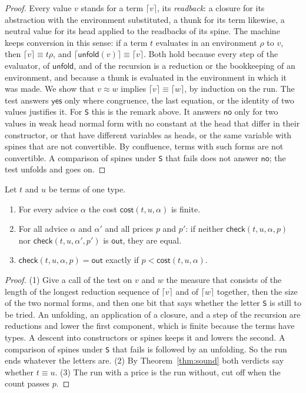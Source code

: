 \documentclass[acmsmall,nonacm,screen]{acmart}
\newcommand{\kw}[1]{\mathsf{#1}}
\newcommand{\conv}{\equiv}
\newcommand{\chk}[4]{\kw{check}(#1, #2, #3, #4)}
\newcommand{\yes}{\kw{yes}}
\newcommand{\no}{\kw{no}}
\newcommand{\out}{\kw{out}}
\newcommand{\cost}[3]{\kw{cost}(#1, #2, #3)}
\newcommand{\adv}[1]{\textup{\texttt{#1}}}
\begin{document}
\begin{proof}
Every value $v$ stands for a term $\lceil v \rceil$, its \emph{readback}: a closure for its
abstraction with the environment substituted, a thunk for its term likewise, a neutral value
for its head applied to the readbacks of its spine. The machine keeps conversion in this
sense: if a term $t$ evaluates in an environment $\rho$ to $v$, then $\lceil v \rceil \conv
t\rho$, and $\lceil \kw{unfold}(v) \rceil \conv \lceil v \rceil$. Both hold because every
step of the evaluator, of $\kw{unfold}$, and of the recursion is a reduction or the
bookkeeping of an environment, and because a thunk is evaluated in the environment in which
it was made. We show that $v \approx w$ implies $\lceil v \rceil \conv \lceil w \rceil$, by
induction on the run. The test answers $\yes$ only where
congruence, the last equation, or the identity of two values justifies it. For \adv{S} this
is the remark above. It answers $\no$ only for two values in weak head normal form with no
constant at the head that differ in their constructor, or that have different variables as
heads, or the same variable with spines that are not convertible. By confluence, terms with
such forms are not convertible. A comparison of spines under \adv{S} that fails does not
answer $\no$; the test unfolds and goes on.
\end{proof}

\begin{theorem}
\label{thm:advice}
Let $t$ and $u$ be terms of one type.
\begin{enumerate}
\item For every advice $\alpha$ the cost $\cost{t}{u}{\alpha}$ is finite.
\item For all advice $\alpha$ and $\alpha'$ and all prices $p$ and $p'$: if neither
  $\chk{t}{u}{\alpha}{p}$ nor $\chk{t}{u}{\alpha'}{p'}$ is $\out$, they are equal.
\item $\chk{t}{u}{\alpha}{p} = \out$ exactly if $p < \cost{t}{u}{\alpha}$.
\end{enumerate}
\end{theorem}

\begin{proof}
(1) Give a call of the test on $v$ and $w$ the measure that consists of the length of the
longest reduction sequence of $\lceil v \rceil$ and of $\lceil w \rceil$ together, then the
size of the two normal forms, and then one bit that says whether the letter \adv{S} is still
to be tried. An unfolding, an application of a closure, and a step of the recursion are
reductions and lower the first component, which is finite because the terms have types. A
descent into constructors or spines keeps it and lowers the second. A comparison of spines
under \adv{S} that fails is followed by an unfolding. So the run ends whatever the letters
are. (2) By Theorem~\ref{thm:sound} both verdicts say whether $t \conv u$. (3) The run with a
price is the run without, cut off when the count passes $p$.
\end{proof}
\end{document}
